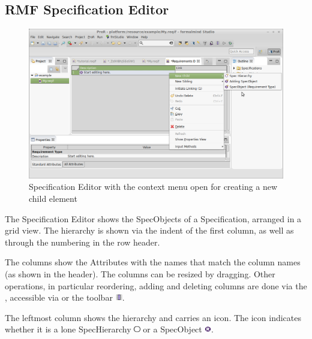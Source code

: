 \subsection{RMF Specification Editor}

\begin{figure}
  \centering
  \includegraphics[width=\linewidth]{../rmf-images/default_spec_view.png}
  \caption{Specification Editor with the context menu open for creating a new child element}
  \label{fig:default specification editor}
\end{figure}

The Specification Editor shows the SpecObjects of a Specification, arranged in a grid view.  The hierarchy is shown via the indent of the first column, as well as through the numbering in the row header.

The columns show the Attributes with the names that match the column names (as shown in the header).  The columns can be resized by dragging.  Other operations, in particular reordering, adding and deleting columns are done via the , accessible via  or the toolbar \includegraphics[height=0.8em]{../rmf-images/icons/full/obj16/Column.png}. 

The leftmost column shows the hierarchy and carries an icon.  The icon indicates whether it is a lone SpecHierarchy \includegraphics[height=0.8em]{../rmf-images/icons/full/obj16/spechierarchy.png} or a SpecObject \includegraphics[height=0.8em]{../rmf-images/icons/full/obj16/requirement.png}.

